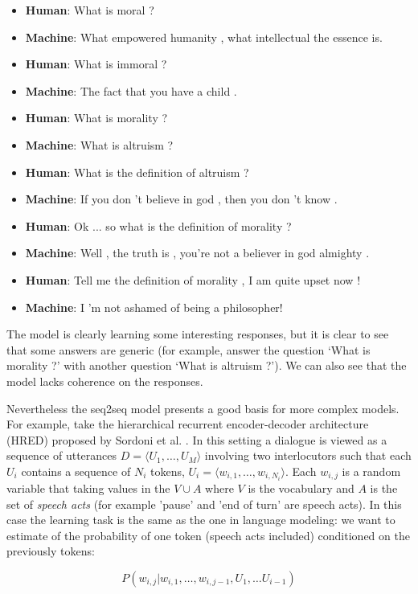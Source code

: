 \begin{itemize}
\item \textbf{Human}: What is moral ?
\item \textbf{Machine}: What empowered humanity , what intellectual the essence is.
\item \textbf{Human}: What is immoral ?
\item \textbf{Machine}: The fact that you have a child .
\item \textbf{Human}: What is morality ?
\item \textbf{Machine}: What is altruism ?
\item \textbf{Human}: What is the definition of altruism ?
\item \textbf{Machine}: If you don ’t believe in god , then you don ’t know .
\item \textbf{Human}: Ok ... so what is the definition of morality ?
\item \textbf{Machine}: Well , the truth is , you're not a believer in god almighty .
\item \textbf{Human}: Tell me the definition of morality , I am quite upset now !
\item \textbf{Machine}: I ’m not ashamed of being a philosopher! 
\end{itemize}

The model is clearly learning some interesting responses, but it is clear to see that some answers are generic (for example, answer the question `What is morality ?' with another question `What is altruism ?'). We can also see that the model lacks coherence on the responses. 

Nevertheless the seq2seq model presents a good basis for more complex models. For example, take the hierarchical recurrent encoder-decoder architecture (HRED) proposed by Sordoni et al. \cite{Serban:2016a}. In this setting a dialogue is viewed as a sequence of utterances $D=\langle U_1 , \dots, U_M \rangle$ involving two interlocutors such that each $U_i$ contains a sequence of $N_i$ tokens, $U_i = \langle w_{i,1} , \dots, w_{i,N_{i}} \rangle$. Each $w_{i,j}$ is a random variable that taking values in the $V\cup A$ where $V$ is the vocabulary and $A$ is the set of \textit{speech acts} (for example 'pause' and 'end of turn' are  speech acts). In this case the learning task is the same as the one in language modeling: we want to estimate of the probability of one token (speech acts included) conditioned on the previously tokens:

\begin{equation}
P(w_{i,j} | w_{i,1}, \dots , w_{i,j-1}, U_{1}, \dots U_{i-1})
\end{equation}


